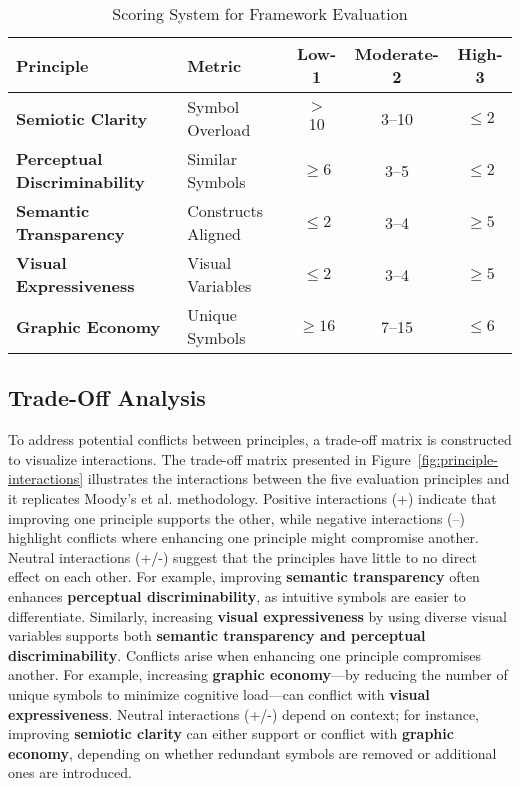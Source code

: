 \documentclass[runningheads]{llncs}
\begin{document}
\begin{table}[h!]
\centering
\caption{Scoring System for Framework Evaluation\label{tab:scoring_system}}
\begin{tabular}{|l|l|c|c|c|} \hline  

\rowcolor[HTML]{EFEFEF} \textbf{Principle} & \textbf{Metric} & \cellcolor[HTML]{FFC7CE} \textbf{Low-1} & \cellcolor[HTML]{FFEB9C}\textbf{Moderate-2} & \cellcolor[HTML]{C6EFCE} \textbf{High-3} \\ \hline  

\textbf{Semiotic Clarity} & Symbol Overload & $>$ 10 & 3--10 & $\leq 2$\\

\textbf{Perceptual Discriminability} & Similar Symbols & $\geq 6$ & 3--5 & $\leq 2$ \\ 

\textbf{Semantic Transparency} & Constructs Aligned & $\leq 2$ & 3--4 & $\geq 5$ \\   

\textbf{Visual Expressiveness} & Visual Variables & $\leq 2$ & 3--4 & $\geq 5$ \\  

\textbf{Graphic Economy} & Unique Symbols & $\geq 16$ & 7--15 & $\leq 6$ \\ \hline 

\end{tabular}
\end{table}

\subsection{Trade-Off Analysis}
To address potential conflicts between principles, a trade-off matrix is constructed to visualize interactions. The trade-off matrix presented in Figure~\ref{fig:principle-interactions} illustrates the interactions between the five evaluation principles and it replicates Moody’s et al. \cite{Moody2010} methodology. Positive interactions (+) indicate that improving one principle supports the other, while negative interactions (--) highlight conflicts where enhancing one principle might compromise another. Neutral interactions (+/-) suggest that the principles have little to no direct effect on each other. For example, improving \textbf{semantic transparency} often enhances \textbf{perceptual discriminability}, as intuitive symbols are easier to differentiate. Similarly, increasing \textbf{visual expressiveness} by using diverse visual variables supports both \textbf{semantic transparency and perceptual discriminability}. Conflicts arise when enhancing one principle compromises another.  For example, increasing \textbf{graphic economy}—by reducing the number of unique symbols to minimize cognitive load—can conflict with \textbf{visual expressiveness}. Neutral interactions (+/-) depend on context; for instance, improving \textbf{semiotic clarity} can either support or conflict with \textbf{graphic economy}, depending on whether redundant symbols are removed or additional ones are introduced.
\end{document}
